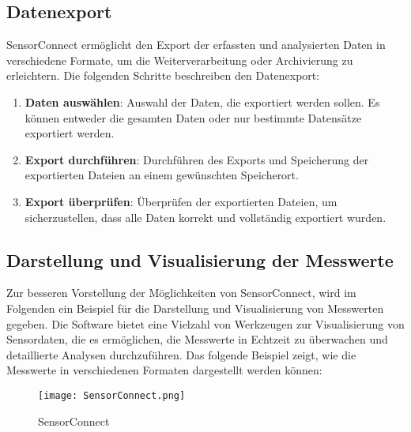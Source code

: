 \subsection{Datenexport}
SensorConnect ermöglicht den Export der erfassten und analysierten Daten in verschiedene Formate, um die Weiterverarbeitung oder Archivierung zu erleichtern. Die folgenden Schritte beschreiben den Datenexport:

\begin{enumerate}
    \item \textbf{Daten auswählen}: Auswahl der Daten, die exportiert werden sollen. Es können entweder die gesamten Daten oder nur bestimmte Datensätze exportiert werden.
    \item \textbf{Export durchführen}: Durchführen des Exports und Speicherung der exportierten Dateien an einem gewünschten Speicherort.
    \item \textbf{Export überprüfen}: Überprüfen der exportierten Dateien, um sicherzustellen, dass alle Daten korrekt und vollständig exportiert wurden.
\end{enumerate}

\subsection{Darstellung und Visualisierung der Messwerte}
Zur besseren Vorstellung der Möglichkeiten von SensorConnect, wird im Folgenden ein Beispiel für die Darstellung und Visualisierung von Messwerten gegeben. Die Software bietet eine Vielzahl von Werkzeugen zur Visualisierung von Sensordaten, die es ermöglichen, die Messwerte in Echtzeit zu überwachen und detaillierte Analysen durchzuführen. Das folgende Beispiel zeigt, wie die Messwerte in verschiedenen Formaten dargestellt werden können:

\begin{figure}[h]
    \begin{center}
        \texttt{[image: SensorConnect.png]}
        \caption[Benutzeroberfläche in SensorConnect]{SensorConnect
        }
        \label{fig:SensorConnect}
    \end{center}
\end{figure}



